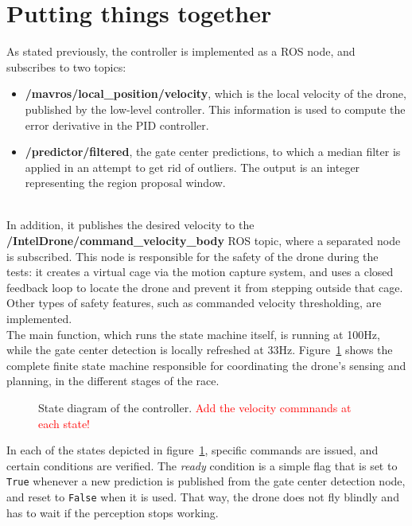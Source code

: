 \section{Putting things together}

As stated previously, the controller is implemented as a ROS node, and
subscribes to two topics:
\begin{itemize}
	\item{\textbf{/mavros/local\_position/velocity}, which is the local velocity
	of the drone, published by the low-level controller. This information is
	used to compute the error derivative in the PID controller.}
	\item{\textbf{/predictor/filtered}, the gate center predictions, to which a
	median filter is applied in an attempt to get rid of outliers. The output
	is an integer representing the region proposal window.}
\end{itemize}

~\\In addition, it publishes the desired velocity to the
\textbf{/IntelDrone/command\_velocity\_body} ROS topic, where a separated node
is subscribed. This node is responsible for the safety of the drone during the
tests: it creates a virtual cage via the motion capture system, and uses a
closed feedback loop to locate the drone and prevent it from stepping outside
that cage. Other types of safety features, such as commanded velocity
thresholding, are implemented.\\

The main function, which runs the state machine itself, is running at 100Hz,
while the gate center detection is locally refreshed at 33Hz.
Figure~\ref{fig:state} shows the complete finite state machine responsible for
coordinating the drone's sensing and planning, in the different stages of the
race.

\begin{figure}[h]
	\centering
	
	\caption{State diagram of the controller. \textcolor{red}{Add the velocity
	commnands at each state!}}
	\label{fig:state}
\end{figure}

In each of the states depicted in figure~\ref{fig:state}, specific commands are
issued, and certain conditions are verified. The \emph{ready} condition is a
simple flag that is set to \texttt{True} whenever a new prediction is published
from the gate center detection node, and reset to \texttt{False} when it is
used. That way, the drone does not fly blindly and has to wait if the
perception stops working.

